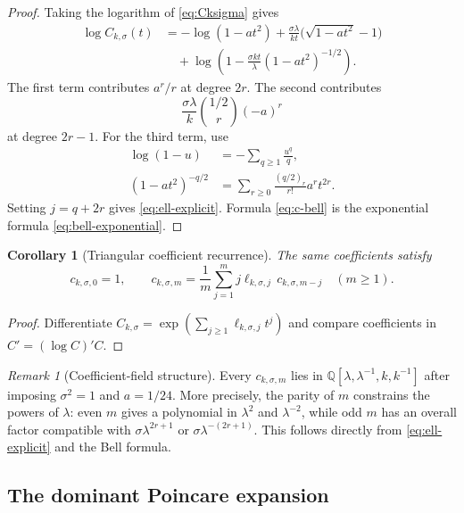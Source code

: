 \documentclass[11pt,a4paper]{article}
\numberwithin{equation}{section}
\newtheorem{corollary}[theorem]{Corollary}
\theoremstyle{remark}
\newtheorem{remark}[theorem]{Remark}
\newcommand{\QQ}{\mathbb Q}
\newcommand{\rising}[2]{(#1)_{#2}}
\begin{document}
\begin{proof}
Taking the logarithm of \cref{eq:Cksigma} gives
\begin{align*}
 \log C_{k,\sigma}(t)
 &=-\log(1-at^2)
 +\frac{\sigma\lambda}{kt}\bigl(\sqrt{1-at^2}-1\bigr)\\
 &\quad+\log\!\left(1-
 \frac{\sigma kt}{\lambda}(1-at^2)^{-1/2}\right).
\end{align*}
The first term contributes $a^r/r$ at degree $2r$.  The second contributes
\[
 \frac{\sigma\lambda}{k}\binom{1/2}{r}(-a)^r
\]
at degree $2r-1$.  For the third term, use
\begin{align*}
 \log(1-u)&=-\sum_{q\ge1}\frac{u^q}{q},\\
 (1-at^2)^{-q/2}
 &=\sum_{r\ge0}\frac{\rising{q/2}{r}}{r!}a^rt^{2r}.
\end{align*}
Setting $j=q+2r$ gives \cref{eq:ell-explicit}.  Formula \cref{eq:c-bell} is the exponential formula \cref{eq:bell-exponential}.
\end{proof}

\begin{corollary}[Triangular coefficient recurrence]\label{cor:c-recurrence}
The same coefficients satisfy
\begin{equation}\label{eq:c-recurrence}
 c_{k,\sigma,0}=1,\qquad
 c_{k,\sigma,m}=\frac1m\sum_{j=1}^{m}
 j\ell_{k,\sigma,j}\,c_{k,\sigma,m-j}
 \quad(m\ge1).
\end{equation}
\end{corollary}

\begin{proof}
Differentiate $C_{k,\sigma}=\exp(\sum_{j\ge1}\ell_{k,\sigma,j}t^j)$ and compare coefficients in
$C'=(\log C)'C$.
\end{proof}

\begin{remark}[Coefficient-field structure]
Every $c_{k,\sigma,m}$ lies in
$\QQ[\lambda,\lambda^{-1},k,k^{-1}]$ after imposing $\sigma^2=1$ and $a=1/24$.  More precisely, the parity of $m$ constrains the powers of $\lambda$: even $m$ gives a polynomial in $\lambda^2$ and $\lambda^{-2}$, while odd $m$ has an overall factor compatible with $\sigma\lambda^{2r+1}$ or $\sigma\lambda^{-(2r+1)}$.  This follows directly from \cref{eq:ell-explicit} and the Bell formula.
\end{remark}

\subsection{The dominant Poincare expansion}
\end{document}
